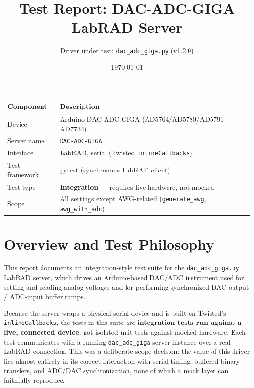 \documentclass[11pt]{article}
\title{\vspace{-1.5cm}\textbf{Test Report: DAC-ADC-GIGA LabRAD Server}}
\author{Driver under test: \texttt{dac\_adc\_giga.py} (v1.2.0)}
\date{\today}
\begin{document}
\maketitle
\thispagestyle{fancy}

\begin{center}
\begin{tabular}{ll}
\toprule
\textbf{Component} & \textbf{Description} \\
\midrule
Device & Arduino DAC-ADC-GIGA (AD5764/AD5780/AD5791 -- AD7734) \\
Server name & \texttt{DAC-ADC-GIGA} \\
Interface & LabRAD, serial (Twisted \texttt{inlineCallbacks}) \\
Test framework & pytest (synchronous LabRAD client) \\
Test type & \textbf{Integration} --- requires live hardware, not mocked \\
Scope & All settings except AWG-related (\texttt{generate\_awg}, \texttt{awg\_with\_adc}) \\
\bottomrule
\end{tabular}
\end{center}

\vspace{0.3cm}
\tableofcontents

\section{Overview and Test Philosophy}

This report documents an integration-style test suite for the
\texttt{dac\_adc\_giga.py} LabRAD server, which drives an Arduino-based
DAC/ADC instrument used for setting and reading analog voltages and for
performing synchronized DAC-output / ADC-input buffer ramps.

Because the server wraps a physical serial device and is built on
Twisted's \texttt{inlineCallbacks}, the tests in this suite are
\textbf{integration tests run against a live, connected device}, not
isolated unit tests against mocked hardware. Each test communicates with
a running \texttt{dac\_adc\_giga} server instance over a real LabRAD
connection. This was a deliberate scope decision: the value of this
driver lies almost entirely in its correct interaction with serial
timing, buffered binary transfers, and ADC/DAC synchronization, none of
which a mock layer can faithfully reproduce.
\end{document}

